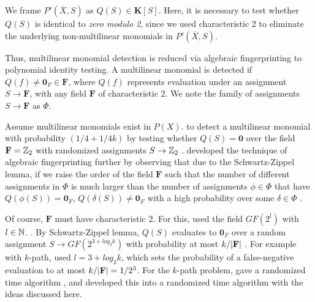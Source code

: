 \begin{problem}
\end{problem}

We frame $P'(\overbar{X}, S)$ as $Q(S) \in \mathbf{K}[S]$. 
Here, it is necessary to test whether $Q(S)$ is identical to \emph{zero modulo 2}, 
since we used characteristic 2 to eliminate 
the underlying non-multilinear monomials in $P'(\overbar{X}, S)$.

Thus, multilinear monomial detection is reduced via algebraic fingerprinting 
to polynomial identity testing. A multilinear monomial is detected if 
$Q(f) \neq \mathbf{0}_F \in \mathbf{F}$, where $Q(f)$ 
represents evaluation under an assignment $S \to \mathbf{F}$, 
with any field $\mathbf{F}$ of characteristic 2. 
We note the family of assignments $S \to \mathbf{F}$ as $\Phi$.

Assume multilinear monomials exist in $P(X)$. 
\citeauthor{Koutis08}  to detect a multilinear monomial 
with  probability $(1/4 + 1/{4k})$ by testing whether 
$Q(S) = \mathbf{0}$ over the field $\mathbf{F} = \mathbb Z_2$  
with randomized assignments $S \to \mathbb Z_2$ \cite{Koutis08}. 
\citeauthor{Williams09} developed the technique of algebraic fingerprinting 
further by observing that due to the Schwartz-Zippel lemma, %
if we raise the order of the field $\mathbf{F}$ 
such that the number of different assignments in $\Phi$ is much larger than 
the number of assignments $\phi \in \Phi$ that have $Q(\phi(S)) = \mathbf{0}_F$, 
$Q(\delta(S)) \neq \mathbf{0}_F$ with a high probability over some $\delta \in \Phi$ 
\cite{Williams09}. 

Of course, $\mathbf{F}$ must have characteristic 2. For this, \citeauthor{Williams09} 
used the field $GF(2^{l})$ with $l \in \mathbb N$. \cite{Williams09}. By Schwartz-Zippel lemma, $Q(S)$ 
evaluates to $\mathbf{0}_F$ over a random assignment $S \to GF(2^{3+log_2k})$ with probability 
at most $k/{\left\vert\mathbf{F}\right\vert}$ \cite{Williams09}. For example with $k$-path, 
\citeauthor{Williams09} used $l = 3+ log_2k$, 
which sets the probability of a false-negative evaluation 
to at most $k/{\left\vert\mathbf{F}\right\vert} = 1/2^3$. 
For the $k$-path problem, \citeauthor{Koutis08} 
gave a randomized  time algorithm \cite{Koutis08}, 
and \citeauthor{Williams09} developed this into a randomized  
time algorithm \cite{Williams09} with the ideas discussed here.

